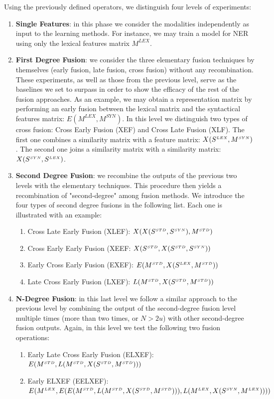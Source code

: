 Using the previously defined operators, we distinguish four levels of experiments: 
\begin{enumerate}
\item \textbf{Single Features}: in this phase we consider the modalities independently as input to the learning methods. For instance, we may train a model for NER using only the lexical features matrix $M^{LEX}$.
\item \textbf{First Degree Fusion}: we  consider the  three elementary fusion techniques by themselves (early fusion, late fusion, cross fusion) without any recombination.  These experiments, as well as those from the previous level, serve as the baselines we set to surpass in order to show the efficacy of the rest of the fusion approaches.
As an example, we may obtain a representation matrix by performing an early fusion between the lexical matrix and the syntactical features matrix: $E(M^{LEX}, M^{SYN})$. In this level we distinguish two types of cross fusion: Cross Early Fusion (XEF) and Cross Late Fusion (XLF). The first one combines a similarity matrix with a feature matrix: $X(S^{\scriptscriptstyle LEX}, M^{\scriptscriptstyle SYN})$. The second one joins a similarity matrix with a similarity matrix: $X(S^{\scriptscriptstyle SYN}, S^{\scriptscriptstyle LEX})$.
\item \textbf{Second Degree Fusion}:  we recombine the outputs of the previous two levels with the elementary techniques. This procedure then yields a recombination of "second-degree" among fusion methods. We introduce the four types of second degree fusions in the following list. Each one is illustrated with an example:

\begin{enumerate}
\item Cross Late Early Fusion (XLEF): $X(X(S^{\scriptscriptstyle STD}, S^{\scriptscriptstyle SYN}), M^{\scriptscriptstyle STD})$
\item Cross Early Early Fusion (XEEF: $X(S^{\scriptscriptstyle STD}, X(S^{\scriptscriptstyle STD}, S^{\scriptscriptstyle SYN}))$
\item Early Cross Early Fusion (EXEF): $E(M^{\scriptscriptstyle STD},X(S^{\scriptscriptstyle LEX}, M^{\scriptscriptstyle STD}))$
\item Late Cross Early Fusion (LXEF): $L(M^{\scriptscriptstyle STD}, X(S^{\scriptscriptstyle STD}, M^{\scriptscriptstyle STD}))$
\end{enumerate}

\item \textbf{N-Degree Fusion}: in this last level we follow a similar approach to the previous level by combining the output of the second-degree fusion level multiple times (more than two times, or $N>2u$) with other second-degree fusion outputs. 
Again, in this level we test the following two fusion operations:
\begin{enumerate}
\item Early Late Cross Early Fusion (ELXEF): $E(M^{\scriptscriptstyle STD}, \allowbreak L(M^{\scriptscriptstyle STD}, X(S^{\scriptscriptstyle STD}, M^{\scriptscriptstyle STD})))$
\item Early ELXEF (EELXEF): $E(M^{\scriptscriptstyle LEX}, E(E(M^{\scriptscriptstyle STD},  L(M^{\scriptscriptstyle STD}, X(S^{\scriptscriptstyle STD}, M^{\scriptscriptstyle STD}))),\allowbreak L(M^{\scriptscriptstyle LEX}, X(S^{\scriptscriptstyle SYN}, M^{\scriptscriptstyle LEX}))))$
\end{enumerate}


\end{enumerate}
